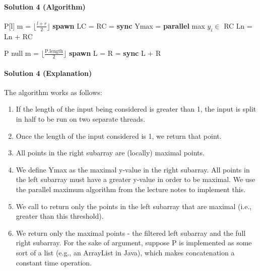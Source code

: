 \documentclass[11pt]{article}
\begin{document}
\paragraph{Solution 4 (Algorithm)}

\begin{algorithmic}[1]
            \State \Return P[l]
        \EndIf
        \State m = $\lfloor \frac{l + r}{2} \rfloor$
        \State \textbf{spawn} LC = 
        \State RC = 
        \State \textbf{sync}
        \State Ymax = \textbf{parallel} max $y_i \in$ RC 
        \State Ln = 
        \State \Return Ln + RC 
    \EndProcedure
\end{algorithmic}

\begin{algorithmic}[1]
                \State \Return P  
            \EndIf
            \State \Return null
        \EndIf
        \State m = $\lfloor \frac{\text{P.length}}{2} \rfloor$
        \State \textbf{spawn} L = 
        \State R = 
        \State \textbf{sync}
        \State \Return L + R 
    \EndProcedure
\end{algorithmic}

\paragraph{Solution 4 (Explanation)}

The  algorithm works as follows:

\begin{enumerate}
    \item If the length of the input being considered is greater than 1, the input is split in half to be run on two separate threads.
    \item Once the length of the input considered is 1, we return that point.
    \item All points in the right subarray are (locally) maximal points.
    \item We define Ymax as the maximal y-value in the right subarray. All points in the left subarray must have a greater y-value in order to be maximal. We use the parallel maximum algorithm from the lecture notes to implement this.
    \item We call  to return only the points in the left subarray that are maximal (i.e., greater than this threshold).
    \item We return only the maximal points - the filtered left subarray and the full right subarray. For the sake of argument, suppose P is implemented as some sort of a list (e.g., an ArrayList in Java), which makes concatenation a constant time operation.
\end{enumerate}
\end{document}
